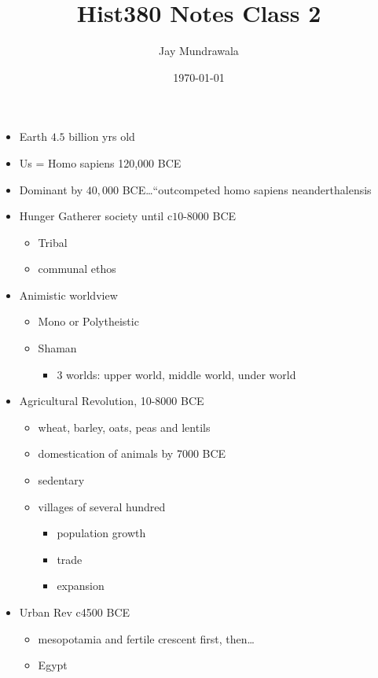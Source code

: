\documentclass[11pt, a4paper]{article}
\begin{document}
\title{Hist380 Notes Class 2}
\author{Jay Mundrawala}
\date{\today}
\maketitle
\begin{itemize}
  \item Earth $4.5$ billion yrs old
  \item Us = Homo sapiens 120,000 BCE
  \item Dominant by $40,000$ BCE\dots``outcompeted homo sapiens neanderthalensis
  \item Hunger Gatherer society until c$10$-$8000$ BCE
    \begin{itemize}
      \item Tribal
      \item communal ethos
    \end{itemize}
  \item Animistic worldview
    \begin{itemize}
      \item Mono or Polytheistic
      \item Shaman
        \begin{itemize}
          \item 3 worlds: upper world, middle world, under world
        \end{itemize}
    \end{itemize}
  \item Agricultural Revolution, 10-8000 BCE
    \begin{itemize}
      \item wheat, barley, oats, peas and lentils
      \item domestication of animals by 7000 BCE
      \item sedentary
      \item villages of several hundred
        \begin{itemize}
          \item population growth
          \item trade
          \item expansion
        \end{itemize}
    \end{itemize}
      \item Urban Rev c4500 BCE
        \begin{itemize}
          \item mesopotamia and fertile crescent first, then\dots
          \item Egypt

\end{itemize}
\end{itemize}
\end{document}

